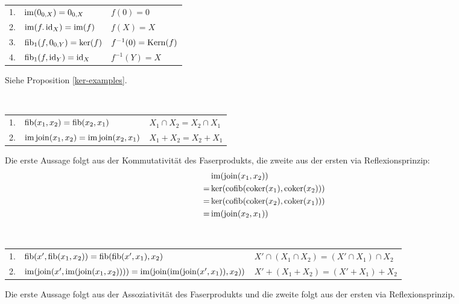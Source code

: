 \begin{lemm}[Regel (a)]
\ \linebreak

\begin{tabular}{rll}
   1.
&  $\operatorname{im}(0_{0,X}) = 0_{0,X}$
&  $f(0) = 0$
\\ 2.
&  $\operatorname{im}(f.\operatorname{id}_X) = \operatorname{im}(f)$
&  $f(X) = X$
\\ 3.
&  $\operatorname{fib}_1(f,0_{0,Y}) = \ker(f)$
&  $f^{-1}(0) = \operatorname{Kern}(f)$
\\ 4.
&  $\operatorname{fib}_1(f,\operatorname{id}_Y) = \operatorname{id}_X$
&  $f^{-1}(Y) = X$
\end{tabular}
\end{lemm}
\begin{bew}
Siehe Proposition \ref{ker-examples}.
\end{bew}

\begin{lemm}[Regel (b)]
\ \linebreak

\begin{tabular}{rll}
   1.
&  $\operatorname{fib}(x_1,x_2) = \operatorname{fib}(x_2,x_1)$  
&  $X_1 \cap X_2 = X_2 \cap X_1$
\\ 2.
&  $\operatorname{im}\operatorname{join}(x_1,x_2) = \operatorname{im}\operatorname{join}(x_2,x_1)$
&  $X_1 + X_2 = X_2 + X_1$
\end{tabular}
\end{lemm}
\begin{bew}
Die erste Aussage folgt aus der Kommutativität des Faserprodukts, die zweite aus der ersten via Reflexionsprinzip:
\begin{align*}
   & \operatorname{im}(\operatorname{join}(x_1,x_2))
\\=& \ker(\operatorname{cofib}(\operatorname{coker}(x_1),\operatorname{coker}(x_2)))
\\=& \ker(\operatorname{cofib}(\operatorname{coker}(x_2),\operatorname{coker}(x_1)))
\\=& \operatorname{im}(\operatorname{join}(x_2,x_1))
\end{align*}
\end{bew}

\begin{lemm}[Regel (c)]
\ \linebreak

\begin{tabular}{rll}
   1.
&  $\operatorname{fib}(x',\operatorname{fib}(x_1,x_2)) = \operatorname{fib}(\operatorname{fib}(x',x_1),x_2)$
&  $X' \cap (X_1 \cap X_2) = (X' \cap X_1) \cap X_2$
\\ 2.
&  $\operatorname{im}(\operatorname{join}(x',\operatorname{im}(\operatorname{join}(x_1,x_2)))) = \operatorname{im}(\operatorname{join}(\operatorname{im}(\operatorname{join}(x',x_1)),x_2))$
&  $X' + (X_1 + X_2) = (X' + X_1) + X_2$
\end{tabular}
\end{lemm}
\begin{bew}
Die erste Aussage folgt aus der Assoziativität des Faserprodukts und die zweite folgt aus der ersten via Reflexionsprinzip.
\end{bew}

